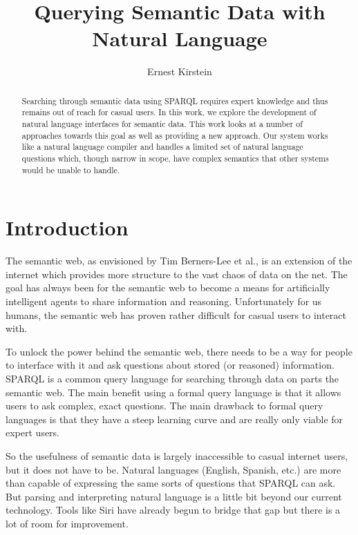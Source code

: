\documentclass[11pt]{article}
\begin{document}
\title{Querying Semantic Data with Natural Language}
\author{Ernest Kirstein}
\maketitle
\clearpage

\tableofcontents
\clearpage

\begin{abstract}
Searching through semantic data using SPARQL requires expert knowledge and thus remains out of reach for casual users. In this work, we explore the development of natural language interfaces for semantic data. This work looks at a number of approaches towards this goal as well as providing a new approach. Our system works like a natural language compiler and handles a limited set of natural language questions which, though narrow in scope, have complex semantics that other systems would be unable to handle.
\end{abstract}
\clearpage

\section{Introduction}
The semantic web, as envisioned by Tim Berners-Lee et al., is an extension of
the internet which provides more structure to the vast chaos of data on the
net. The goal has always been for the semantic web to become a means for 
artificially intelligent agents to share information and reasoning\cite{semantic}.
Unfortunately for us humans, the semantic web has proven rather difficult for
casual users to interact with.

To unlock the power behind the semantic web, there needs to be a way for people
to interface with it and ask questions about stored (or reasoned) information. 
SPARQL is a common query language for searching through data on parts the 
semantic web\cite{sparql}. The main benefit using a formal query language 
is that it allows users to ask complex, exact questions. 
The main drawback to formal query languages is that
they have a steep learning curve and are really only viable for expert users.

So the usefulness of semantic data is largely inaccessible to casual internet users,
but it does not have to be. Natural languages (English, Spanish, etc.) are more than
capable of expressing the same sorts of questions that SPARQL can ask. But parsing and 
interpreting natural language is a little bit beyond
our current technology. Tools like Siri\cite{siri} have already begun to bridge that
gap but there is a lot of room for improvement. 
\end{document}
